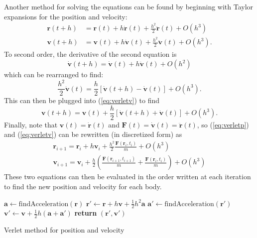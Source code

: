 \documentclass[aps,prc,reprint,nobalancelastpage]{revtex4-1}
\begin{document}
        Another method for solving the equations can be found by beginning with Taylor expansions for the position and velocity:
        \begin{align}
            \mathbf{r}(t+h) &= \mathbf{r}(t) + h \dot{\mathbf{r}}(t) + \frac{h^2}{2}\ddot{\mathbf{r}}(t) + O(h^3) \label{eq:verletp}\\
            \mathbf{v}(t+h) &= \mathbf{v}(t) + h \dot{\mathbf{v}}(t) + \frac{h^2}{2}\ddot{\mathbf{v}}(t) + O(h^3). \label{eq:verletv}
        \end{align}
        To second order, the derivative of the second equation is
        \begin{equation}
            \dot{\mathbf{v}}(t+h) = \dot{\mathbf{v}}(t) + h \ddot{\mathbf{v}}(t) + O(h^2)
        \end{equation}
        which can be rearranged to find:
        \begin{equation}
            \frac{h^2}{2}\ddot{\mathbf{v}}(t) = \frac{h}{2} [\dot{\mathbf{v}}(t+h) - \dot{\mathbf{v}}(t)] + O(h^3).
        \end{equation}
        This can then be plugged into (\ref{eq:verletv}) to find
        \begin{equation}
            \mathbf{v}(t+h) = \mathbf{v}(t) + \frac{h}{2} [\dot{\mathbf{v}}(t+h) + \dot{\mathbf{v}}(t)] + O(h^3).
        \end{equation}
        Finally, note that $\mathbf{v}(t) = \dot{\mathbf{r}}(t)$ and $\mathbf{F}(t) = \dot{\mathbf{v}}(t) = \ddot{\mathbf{r}}(t)$, so (\ref{eq:verletp}) and (\ref{eq:verletv}) can be rewritten (in discretized form) as
        \begin{gather}
            \mathbf{r}_{i+1} = \mathbf{r}_i + h\mathbf{v}_i + \frac{h^2}{2} \frac{\mathbf{F}(\mathbf{r}_i, t_i)}{m} + O(h^3) \\
            \mathbf{v}_{i+1} = \mathbf{v}_i + \frac{h}{2} \left(\frac{\mathbf{F}(\mathbf{r}_{i+1}, t_{i+1})}{m} + \frac{\mathbf{F}(\mathbf{r}_i, t_i)}{m}\right) + O(h^3)
        \end{gather}
        These two equations can then be evaluated in the order written at each iteration to find the new position and velocity for each body.

            \begin{algorithm}[H]
                \begin{algorithmic}
                        \State $\mathbf{a} \gets \text{findAcceleration}(\mathbf{r})$
                        \State $\mathbf{r}' \gets \mathbf{r} + h \mathbf{v} + \frac{1}{2} h^2 \mathbf{a}$
                        \State $\mathbf{a}' \gets \text{findAcceleration}(\mathbf{r}')$
                        \State $\mathbf{v}' \gets \mathbf{v} + \frac{1}{2} h (\mathbf{a} + \mathbf{a}')$
                        \State \textbf{return} $(\mathbf{r}', \mathbf{v}')$
                    \EndFunction
                \end{algorithmic}
                \caption{Verlet method for position and velocity}
            \end{algorithm}
\end{document}
